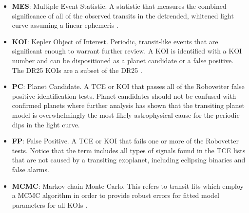 \begin{itemize}
\item[] \textbf{MES}: Multiple Event Statistic. A statistic that measures the combined significance of all of the observed transits in the detrended, whitened light curve assuming a linear ephemeris \citep[][]{Jenkins2002b}.
\item[] \textbf{KOI}: Kepler Object of Interest. Periodic, transit-like events that are significant enough to warrant further review. A KOI is identified with a KOI number and can be dispositioned as a planet candidate or a false positive. The DR25 KOIs are a subset of the DR25 .
\item[] \textbf{PC}: Planet Candidate. A TCE or KOI that passes all of the Robovetter false positive identification tests. Planet candidates should not be confused with confirmed planets where further analysis has shown that the transiting planet model is overwhelmingly the most likely astrophysical cause for the periodic dips in the \Kepler{} light curve.
\item[] \textbf{FP}: False Positive. A TCE or KOI that fails one or more of the Robovetter tests. Notice that the term includes all types of signals found in the TCE lists that are not caused by a transiting exoplanet, including eclipsing binaries and false alarms.
\item[] \textbf{MCMC}: Markov chain Monte Carlo. This refers to transit fits which employ a MCMC algorithm in order to provide robust errors for fitted model parameters for all KOIs
 \citep{Hoffman2017}.



\end{itemize}